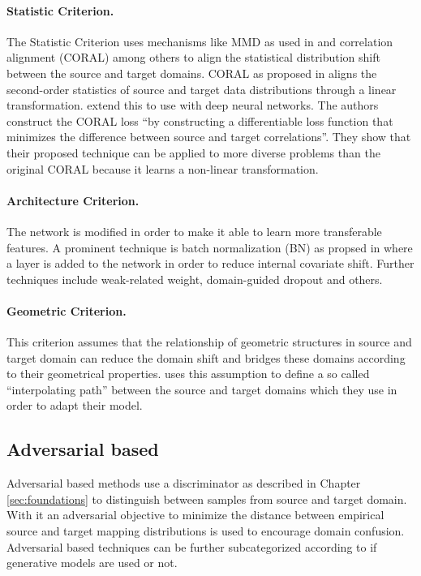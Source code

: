 \paragraph{Statistic Criterion.}
The Statistic Criterion uses mechanisms like MMD as used in \cite{DBLP:journals/corr/ZhangYCW15} and correlation alignment (CORAL) among others to align the statistical distribution shift between the source and target domains. CORAL as proposed in \cite{DBLP:journals/corr/SunFS15} aligns the second-order statistics of source and target data distributions through a linear transformation. \cite{DBLP:journals/corr/SunS16a} extend this to use with deep neural networks. The authors construct the CORAL loss ``by constructing a differentiable loss function that minimizes the difference between source and target correlations''. They show that their proposed technique can be applied to more diverse problems than the original CORAL because it learns a non-linear transformation.

\paragraph{Architecture Criterion.}
The network is modified in order to make it able to learn more transferable features. A prominent technique is batch normalization (BN) as propsed in \cite{DBLP:journals/corr/IoffeS15} where a layer is added to the network in order to reduce internal covariate shift.  Further techniques include weak-related weight, domain-guided dropout and others. %

\paragraph{Geometric Criterion.}
This criterion assumes that the relationship of geometric structures in source and target domain can reduce the domain shift and bridges these domains according to their geometrical properties. \cite{Chopra2013DLIDDL} uses this assumption to define a so called ``interpolating path'' between the source and target domains which they use in order to adapt their model.

\subsection{Adversarial based}
Adversarial based methods use a discriminator as described in Chapter \ref{sec:foundations} to distinguish between samples from source and target domain. With it an adversarial objective to minimize the distance between empirical source and target mapping distributions is used to encourage domain confusion. Adversarial based techniques can be further subcategorized according to if generative models are used or not.

